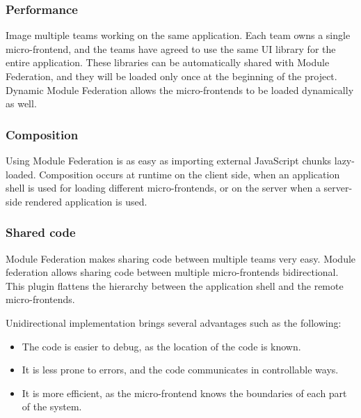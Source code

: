 \subsubsection{Performance}\label{subsubsection:background:micro-frontend:module-federation:performance}

Image multiple teams working on the same application. Each team owns a single micro-frontend, and the teams have agreed to use the same UI library for the entire application. These libraries can be automatically shared with Module Federation, and they will be loaded only once at the beginning of the project. Dynamic Module Federation allows the micro-frontends to be loaded dynamically as well. \cite[83]{book:2021:mezzalira:applied-methods:building-micro-frontends}

\subsubsection{Composition}\label{subsubsection:background:micro-frontend:module-federation:composition}

Using Module Federation is as easy as importing external JavaScript chunks lazy-loaded. Composition occurs at runtime on the client side, when an application shell is used for loading different micro-frontends, or on the server when a server-side rendered application is used. \cite[84]{book:2021:mezzalira:applied-methods:building-micro-frontends}

\subsubsection{Shared code}\label{subsubsection:background:micro-frontend:module-federation:shared-code}

Module Federation makes sharing code between multiple teams very easy. Module federation allows sharing code between multiple micro-frontends bidirectional. This plugin flattens the hierarchy between the application shell and the remote micro-frontends.

\noindent Unidirectional implementation brings several advantages such as the following: \cite[84]{book:2021:mezzalira:applied-methods:building-micro-frontends}

\begin{itemize}
    \item The code is easier to debug, as the location of the code is known.
    \item It is less prone to errors, and the code communicates in controllable ways.
    \item It is more efficient, as the micro-frontend knows the boundaries of each part of the system.
\end{itemize}

